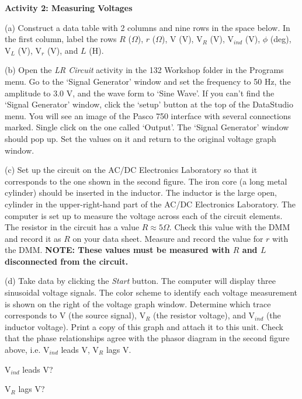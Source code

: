 \textbf{Activity 2: Measuring Voltages} 

(a) Construct a data table with 2 columns and nine rows in the space
below. In the first column, label the rows $R$ (\( \Omega  \)), $r$ (\( \Omega  \)), V (V),
V\( _{R} \) (V), V\( _{ind} \) (V), \( \phi  \) (deg), V\( _{L} \)
(V), V\( _{r} \) (V), and $L$ (H).
\vspace{4in}

(b) Open the \emph{LR Circuit} activity
in the 132 Workshop folder in the Programs menu. 
Go to the `Signal Generator' window and set the frequency to 50 Hz, the amplitude 
to 3.0 V, and the wave form to `Sine Wave'.
If you can't find the `Signal Generator' window, click the `setup' button at
the top of the DataStudio menu.
You will see an image of the Pasco 750 interface with several
connections marked.
Single click on the one called `Output'.
The `Signal Generator' window should pop up. 
Set the values on it and return to the original voltage graph window.

(c) Set up the circuit on the AC/DC Electronics Laboratory so that it corresponds to the one shown in the second figure. The iron core (a long metal cylinder) should be inserted in the inductor. The inductor is the large open, cylinder in the upper-right-hand part of the AC/DC Electronics Laboratory.
The computer is set up to measure the voltage
across each of the circuit elements. The resistor in the circuit 
has a value $R\approx 5\Omega$. Check this value with the DMM and record it
as $R$ on your data sheet. Measure and record the value for $r$ with the DMM.
\textbf{NOTE: These values must be measured with $R$ and $L$ disconnected from the circuit.}

(d) Take data by clicking the \emph{Start} button. The computer will display three sinusoidal
voltage signals. The color scheme to identify each voltage measurement
is shown on the right of the voltage graph window. Determine which trace
corresponds to V (the source signal), V\( _{R} \) (the resistor voltage), and V\( _{ind} \) (the inductor voltage). 
Print a copy of this graph and attach it to this unit.
Check that the phase relationships agree with
the phasor diagram in the second figure above, i.e. V\( _{ind} \) leads V, V\( _{R} \) lags V.
\vspace{5.0mm}

\hspace{2.0in} V\( _{ind} \) leads V?
\vspace{5.0mm}

\hspace{2.0in} V\( _{R} \) lags V?
\vspace{5.0mm}

